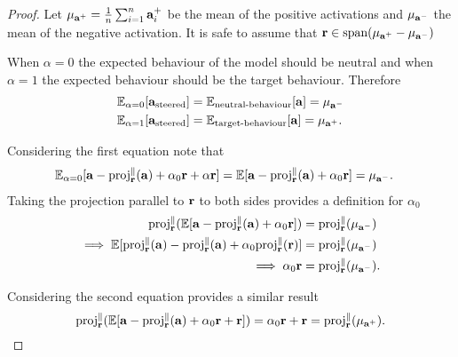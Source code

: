 \begin{proof}
    Let $\mu_{\mathbf{a}^+} = \frac{1}{n}\sum_{i=1}^{n}\mathbf{a}_i^+$ be the mean of the positive activations and $\mu_{\mathbf{a}^-}$ the mean of the negative activation.
    It is safe to assume that $\mathbf{r} \in \text{span}(\mu_{\mathbf{a}^+} - \mu_{\mathbf{a}^-})$

    When $\alpha = 0$ the expected behaviour of the model should be neutral and when $\alpha = 1$ the expected behaviour should be the target behaviour.
    Therefore
    \begin{equation*}
        \begin{aligned}
            \mathbb{E}_{\alpha=0}[\mathbf{a}_\text{steered}] &= \mathbb{E}_\text{neutral-behaviour}[\mathbf{a}] = \mu_{\mathbf{a}^-} \\
            \mathbb{E}_{\alpha=1}[\mathbf{a}_\text{steered}] &= \mathbb{E}_\text{target-behaviour}[\mathbf{a}] = \mu_{\mathbf{a}^+}.
        \end{aligned}
    \end{equation*}

    Considering the first equation note that
    \begin{equation*}
        \begin{aligned}
            \mathbb{E}_{\alpha=0}[\mathbf{a} - \text{proj}_{\mathbf{r}}^{\parallel}(\mathbf{a}) + \alpha_0\mathbf{r} + \alpha\mathbf{r}] &=  \mathbb{E}[\mathbf{a} - \text{proj}_{\mathbf{r}}^{\parallel}(\mathbf{a}) + \alpha_0\mathbf{r}] = \mu_{\mathbf{a}^-}.
        \end{aligned}
    \end{equation*}
    Taking the projection parallel to $\mathbf{r}$ to both sides provides a definition for $\alpha_0$
    \begin{equation*}
        \begin{aligned}
            \text{proj}_{\mathbf{r}}^{\parallel}(\mathbb{E}[\mathbf{a} - \text{proj}_{\mathbf{r}}^{\parallel}(\mathbf{a}) + \alpha_0\mathbf{r}]) &= \text{proj}_{\mathbf{r}}^{\parallel}(\mu_{\mathbf{a}^-}) \\
            \implies \mathbb{E}[\text{proj}_{\mathbf{r}}^{\parallel}(\mathbf{a}) - \text{proj}_{\mathbf{r}}^{\parallel}(\mathbf{a}) + \alpha_0\text{proj}_{\mathbf{r}}^{\parallel}(\mathbf{r})] &= \text{proj}_{\mathbf{r}}^{\parallel}(\mu_{\mathbf{a}^-}) \\
            \implies \alpha_0\mathbf{r} &= \text{proj}_{\mathbf{r}}^{\parallel}(\mu_{\mathbf{a}^-}).
        \end{aligned}
    \end{equation*}

    Considering the second equation provides a similar result
    \begin{equation*}
        \text{proj}_{\mathbf{r}}^{\parallel}(\mathbb{E}[\mathbf{a} - \text{proj}_{\mathbf{r}}^{\parallel}(\mathbf{a}) + \alpha_0\mathbf{r} + \mathbf{r}]) = \alpha_0\mathbf{r} + \mathbf{r} = \text{proj}_{\mathbf{r}}^{\parallel}(\mu_{\mathbf{a}^+}).
    \end{equation*}


\end{proof}

